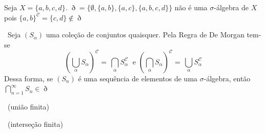 \documentclass[a4paper, 11pt]{book}
\theoremstyle{definition}
\newcommand{\obs}{\noindent{\textbf{\textcolor{black}{\sffamily Observação:}}}~}
\newcommand{\cC}{\mathcal{C}}
\begin{document}
\begin{ex}
    Seja $X = \{a, b, c, d\}$. $\eth = \{\emptyset, \{a,b\}, \{a,c\}, \{a,b,c,d\}\}$ não é uma $\sigma$-álgebra de $X$ pois $\{a,b\}^{\mathcal{C}} = \{c,d\} \not\in \eth$
\end{ex}

\obs Seja $(S_\alpha)$ uma coleção de conjuntos quaisquer. Pela Regra de De Morgan tem-se
\[
    \left( \bigcup_{\alpha} S_\alpha \right)^\cC \!\! = \,\bigcap_\alpha S_\alpha^\cC \;\text{ e }  \left( \bigcap_{\alpha} S_\alpha \right)^\cC \!\! = \,\bigcup_\alpha S_\alpha^\cC
\]
Dessa forma, se $(S_n)$ é uma sequência de elementos de uma $\sigma$-álgebra, então $\bigcap_{n=1}^\infty S_n \in \eth$

\obs (união finita)

\obs (interseção finita)
\end{document}
